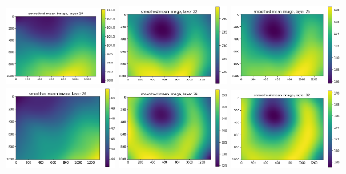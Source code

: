 \documentclass[letterpaper,11pt]{article}
\begin{document}
\begin{figure}[!ht]
\includegraphics[width=0.32\textwidth]{images/results/smoothed_mean_image_layers/smoothed_mean_image_layer_19}
\includegraphics[width=0.32\textwidth]{images/results/smoothed_mean_image_layers/smoothed_mean_image_layer_22}
\includegraphics[width=0.32\textwidth]{images/results/smoothed_mean_image_layers/smoothed_mean_image_layer_25}
\includegraphics[width=0.32\textwidth]{images/results/smoothed_mean_image_layers/smoothed_mean_image_layer_26}
\includegraphics[width=0.32\textwidth]{images/results/smoothed_mean_image_layers/smoothed_mean_image_layer_29}
\includegraphics[width=0.32\textwidth]{images/results/smoothed_mean_image_layers/smoothed_mean_image_layer_32}

\end{figure}
\end{document}
